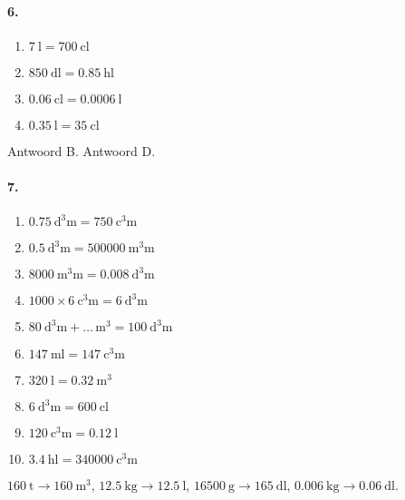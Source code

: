 \documentclass[a4paper,12pt]{article}
\begin{document}
\paragraph{6.}
\begin{enumerate}
  \item \(\SI{7}{\litre}=\SI{700}{\centi\litre}\)
  \item \(\SI{850}{\deci\litre}=\SI{0.85}{\hecto\litre}\)
  \item \(\SI{0.06}{\centi\litre}=\SI{0.0006}{\litre}\)
  \item \(\SI{0.35}{\litre}=\SI{35}{\centi\litre}\)
\end{enumerate}
Antwoord B.\quad \; Antwoord D.

\paragraph{7.}
\begin{multicols}{2}
\begin{enumerate}
  \item \(\SI{0.75}{\cubic\deci\metre}=\SI{750}{\cubic\centi\metre}\)
  \item \(\SI{0.5}{\cubic\deci\metre}=\SI{500000}{\cubic\milli\metre}\)
  \item \(\SI{8000}{\cubic\milli\metre}=\SI{0.008}{\cubic\deci\metre}\)
  \item \(\num{1000}\times \SI{6}{\cubic\centi\metre}=\SI{6}{\cubic\deci\metre}\)
  \item \(\SI{80}{\cubic\deci\metre}+\ldots\,\si{\cubic\metre}=\SI{100}{\cubic\deci\metre}\)
  \item \(\SI{147}{\milli\litre}=\SI{147}{\cubic\centi\metre}\)
  \item \(\SI{320}{\litre}=\SI{0.32}{\cubic\metre}\)
  \item \(\SI{6}{\cubic\deci\metre}=\SI{600}{\centi\litre}\)
  \item \(\SI{120}{\cubic\centi\metre}=\SI{0.12}{\litre}\)
  \item \(\SI{3.4}{\hecto\litre}=\SI{340000}{\cubic\centi\metre}\)
\end{enumerate}
\end{multicols}
\(\SI{160}{\tonne}\to\SI{160}{\cubic\metre}\), \; \(\SI{12.5}{\kilo\gram}\to\SI{12.5}{\litre}\), \; \(\SI{16500}{\gram}\to\SI{165}{\deci\litre}\), \; \(\SI{0.006}{\kilo\gram}\to\SI{0.06}{\deci\litre}\).

\bigskip
\end{document}

